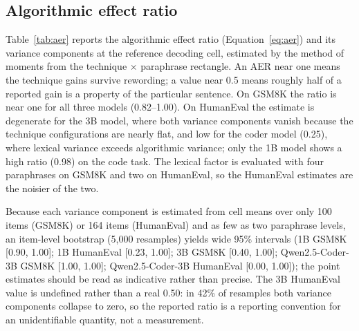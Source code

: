 \documentclass[conference]{IEEEtran}
\begin{document}
\subsection{Algorithmic effect ratio}
\label{sec:results-aer}

Table~\ref{tab:aer} reports the algorithmic effect ratio
(Equation~\eqref{eq:aer}) and its variance components at the
reference decoding cell, estimated by the method of moments from the
technique $\times$ paraphrase rectangle.  An AER near one means the
technique gains survive rewording; a value near 0.5 means roughly
half of a reported gain is a property of the particular sentence.  On
GSM8K the ratio is near one for all three models (0.82--1.00).  On
HumanEval the estimate is degenerate for the 3B model, where both
variance components vanish because the technique configurations are
nearly flat, and low for the coder model (0.25), where lexical
variance exceeds algorithmic variance; only the 1B model shows a high
ratio (0.98) on the code task.  The lexical factor is evaluated with
four paraphrases on GSM8K and two on HumanEval, so the HumanEval
estimates are the noisier of the two.

Because each variance component is estimated from cell means over
only 100 items (GSM8K) or 164 items (HumanEval) and as few as two
paraphrase levels, an item-level bootstrap (5,000 resamples) yields
wide 95\% intervals (1B GSM8K [0.90, 1.00]; 1B HumanEval [0.23, 1.00];
3B GSM8K [0.40, 1.00]; Qwen2.5-Coder-3B GSM8K [1.00, 1.00];
Qwen2.5-Coder-3B HumanEval [0.00, 1.00]); the point estimates should
be read as indicative rather than precise.  The 3B HumanEval value
is undefined rather than a real 0.50: in 42\% of resamples both
variance components collapse to zero, so the reported ratio is a
reporting convention for an unidentifiable quantity, not a
measurement.
\end{document}

